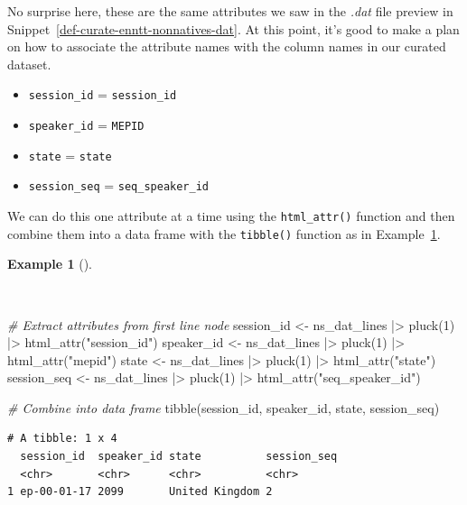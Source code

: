 \documentclass[
  letterpaper,
  krantz1]{latex/krantz-mod}
\newenvironment{Shaded}{\begin{snugshade}}{\end{snugshade}}
\newcommand{\CommentTok}[1]{\textcolor[rgb]{0.00,0.00,0.00}{\textit{#1}}}
\newcommand{\DecValTok}[1]{\textcolor[rgb]{0.00,0.00,0.00}{#1}}
\newcommand{\FunctionTok}[1]{\textcolor[rgb]{0.00,0.00,0.00}{#1}}
\newcommand{\NormalTok}[1]{\textcolor[rgb]{0.00,0.00,0.00}{#1}}
\newcommand{\OtherTok}[1]{\textcolor[rgb]{0.00,0.00,0.00}{#1}}
\newcommand{\SpecialCharTok}[1]{\textcolor[rgb]{0.00,0.00,0.00}{#1}}
\newcommand{\StringTok}[1]{\textcolor[rgb]{0.00,0.00,0.00}{#1}}
\providecommand{\tightlist}{%
  \setlength{\itemsep}{0pt}\setlength{\parskip}{0pt}}\usepackage{longtable,booktabs,array}
\theoremstyle{definition}
\newtheorem{example}{Example}[chapter]
\theoremstyle{definition}
\theoremstyle{remark}
\begin{document}
No surprise here, these are the same attributes we saw in the
\emph{.dat} file preview in
Snippet~\ref{def-curate-enntt-nonnatives-dat}. At this point, it's good
to make a plan on how to associate the attribute names with the column
names in our curated dataset.

\pagebreak

\begin{itemize}
\tightlist
\item
  \texttt{session\_id} = \texttt{session\_id}
\item
  \texttt{speaker\_id} = \texttt{MEPID}
\item
  \texttt{state} = \texttt{state}
\item
  \texttt{session\_seq} = \texttt{seq\_speaker\_id}
\end{itemize}

We can do this one attribute at a time using the \texttt{html\_attr()}
function and then combine them into a data frame with the
\texttt{tibble()} function as in
Example~\ref{exm-curate-enntt-extract-attributes}.

\begin{example}[]\protect\hypertarget{exm-curate-enntt-extract-attributes}{}\label{exm-curate-enntt-extract-attributes}

~

\begin{Shaded}
\begin{Highlighting}[numbers=left,,]
\CommentTok{\# Extract attributes from first line node}
\NormalTok{session\_id }\OtherTok{\textless{}{-}}\NormalTok{ ns\_dat\_lines }\SpecialCharTok{|\textgreater{}} \FunctionTok{pluck}\NormalTok{(}\DecValTok{1}\NormalTok{) }\SpecialCharTok{|\textgreater{}} \FunctionTok{html\_attr}\NormalTok{(}\StringTok{"session\_id"}\NormalTok{)}
\NormalTok{speaker\_id }\OtherTok{\textless{}{-}}\NormalTok{ ns\_dat\_lines }\SpecialCharTok{|\textgreater{}} \FunctionTok{pluck}\NormalTok{(}\DecValTok{1}\NormalTok{) }\SpecialCharTok{|\textgreater{}} \FunctionTok{html\_attr}\NormalTok{(}\StringTok{"mepid"}\NormalTok{)}
\NormalTok{state }\OtherTok{\textless{}{-}}\NormalTok{ ns\_dat\_lines }\SpecialCharTok{|\textgreater{}} \FunctionTok{pluck}\NormalTok{(}\DecValTok{1}\NormalTok{) }\SpecialCharTok{|\textgreater{}} \FunctionTok{html\_attr}\NormalTok{(}\StringTok{"state"}\NormalTok{)}
\NormalTok{session\_seq }\OtherTok{\textless{}{-}}\NormalTok{ ns\_dat\_lines }\SpecialCharTok{|\textgreater{}} \FunctionTok{pluck}\NormalTok{(}\DecValTok{1}\NormalTok{) }\SpecialCharTok{|\textgreater{}} \FunctionTok{html\_attr}\NormalTok{(}\StringTok{"seq\_speaker\_id"}\NormalTok{)}

\CommentTok{\# Combine into data frame}
\FunctionTok{tibble}\NormalTok{(session\_id, speaker\_id, state, session\_seq)}
\end{Highlighting}
\end{Shaded}

\begin{verbatim}
# A tibble: 1 x 4
  session_id  speaker_id state          session_seq
  <chr>       <chr>      <chr>          <chr>      
1 ep-00-01-17 2099       United Kingdom 2          
\end{verbatim}

\end{example}
\end{document}
